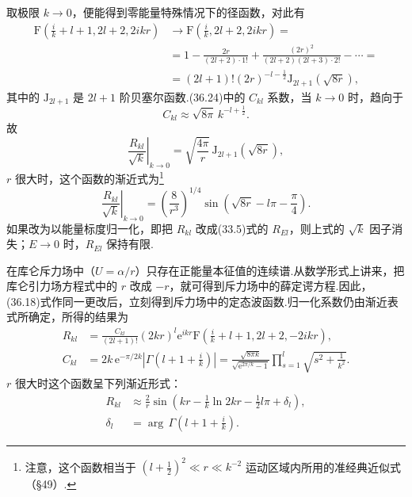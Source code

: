 取极限 $k\to0$，便能得到零能量特殊情况下的径函数，对此有
\begin{equation*}
\begin{aligned}
  \mathrm{F}\left(\frac{i}{k}+l+1,2l+2,2ikr\right)&\to
  \mathrm{F}\left(\frac{i}{k},2l+2,2ikr\right)=\\
  &=1-\frac{2r}{(2l+2)\cdot 1!}
  +\frac{(2r)^2}{(2l+2)(2l+3)\cdot 2!}-\cdots=\\
  &=(2l+1)!(2r)^{-l-\frac{1}{2}}\mathrm{J}_{2l+1}(\sqrt{8r}),
\end{aligned}
\end{equation*}
其中的 $\mathrm{J}_{2l+1}$ 是 $2l+1$ 阶贝塞尔函数.(36.24)中的 $C_{kl}$ 系数，当 $k\to0$ 时，趋向于
\begin{equation*}
  C_{kl}\approx\sqrt{8\pi}\,k^{-l+\frac{1}{2}}.
\end{equation*}
故
\begin{equation}
  \left.\frac{R_{kl}}{\sqrt{k}}\right|_{k\to0}
  =\sqrt{\frac{4\pi}{r}}\,\mathrm{J}_{2l+1}(\sqrt{8r}),
\end{equation}
$r$ 很大时，这个函数的渐近式为\footnote{注意，这个函数相当于 $\left(l+\frac{1}{2}\right)^2\ll r\ll k^{-2}$ 运动区域内所用的准经典近似式（§49）.}
\begin{equation}
  \left.\frac{R_{kl}}{\sqrt{k}}\right|_{k\to0}
  =\left(\frac{8}{r^3}\right)^{1/4}\sin\left(\sqrt{8r}-l\pi-\frac{\pi}{4}\right).
\end{equation}
如果改为以能量标度归一化，即把 $R_{kl}$ 改成(33.5)式的 $R_{El}$，则上式的 $\sqrt{k}$ 因子消失；$E\to0$ 时，$R_{El}$ 保持有限.

在库仑斥力场中（$U=\alpha/r$）只存在正能量本征值的连续谱.从数学形式上讲来，把库仑引力场方程式中的 $r$ 改成 $-r$，就可得到斥力场中的薛定谔方程.因此，(36.18)式作同一更改后，立刻得到斥力场中的定态波函数.归一化系数仍由渐近表式所确定，所得的结果为
\begin{equation}
\begin{aligned}
  R_{kl}&=\frac{C_{kl}}{(2l+1)!}(2kr)^l\mathrm{e}^{ikr}
  \mathrm{F}\left(\frac{i}{k}+l+1,2l+2,-2ikr\right),\\
  C_{kl}&=2k\,\mathrm{e}^{-\pi/2k}\left|\Gamma\left(l+1+\frac{i}{k}\right)\right|
  =\frac{\sqrt{8\pi k}}{\sqrt{\mathrm{e}^{2\pi/k}-1}}
  \prod_{s=1}^{l}\sqrt{s^2+\frac{1}{k^2}}.
\end{aligned}
\end{equation}
$r$ 很大时这个函数呈下列渐近形式：
\begin{equation}
\begin{aligned}
  R_{kl}&\approx\frac{2}{r}\sin\left(kr-\frac{1}{k}\ln 2kr-\frac{1}{2}l\pi+\delta_l\right),\\
  \delta_l&=\arg\,\Gamma\left(l+1+\frac{i}{k}\right).
\end{aligned}
\end{equation}

